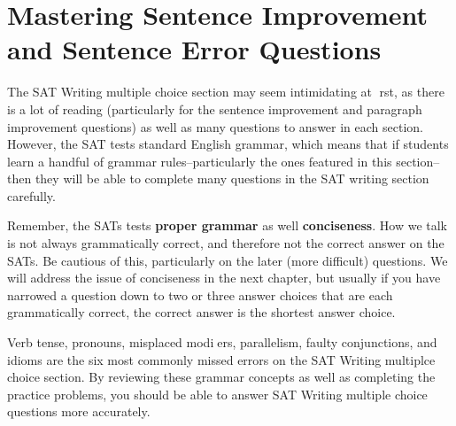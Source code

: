 \section{Mastering Sentence Improvement and Sentence Error Questions}

The SAT Writing multiple choice section may seem intimidating at rst, as there is a lot of reading (particularly for the sentence improvement and paragraph improvement questions) as well as many questions to answer in each section. However, the SAT tests standard English grammar, which means that if students learn a handful of grammar rules--particularly the ones featured in this
section--then they will be able to complete many questions in the SAT writing section carefully.

\bigskip
Remember, the SATs tests \textbf{proper grammar} as well \textbf{conciseness}. How we talk is not always
grammatically correct, and therefore not the correct answer on the SATs. Be cautious of this,
particularly on the later (more difficult) questions. We will address the issue of conciseness in the
next chapter, but usually if you have narrowed a question down to two or three answer choices
that are each grammatically correct, the correct answer is the shortest answer choice.

\bigskip
Verb tense, pronouns, misplaced modiers, parallelism, faulty conjunctions, and idioms are the six
most commonly missed errors on the SAT Writing multiplce choice section. By reviewing these
grammar concepts as well as completing the practice problems, you should be able to answer SAT
Writing multiple choice questions more accurately.